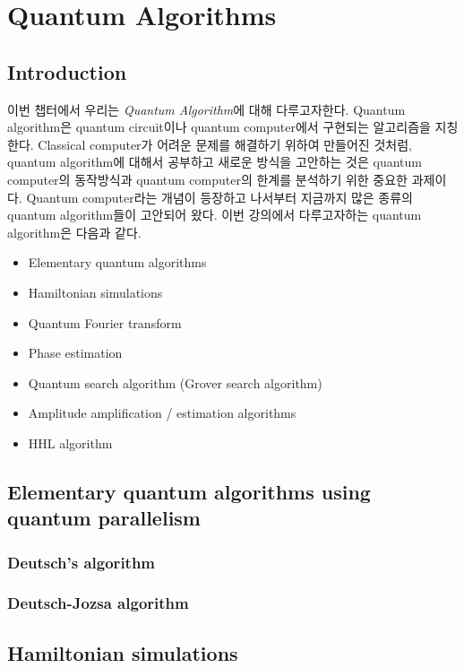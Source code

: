 \chapter{Quantum Algorithms}
\section{Introduction}
이번 챕터에서 우리는 \textit{Quantum Algorithm}에 대해 다루고자한다. Quantum algorithm은 quantum circuit이나 quantum computer에서 구현되는 알고리즘을 지칭한다.
Classical computer가 어려운 문제를 해결하기 위하여 만들어진 것처럼, quantum algorithm에 대해서 공부하고 새로운 방식을 고안하는 것은 quantum computer의 동작방식과 quantum computer의 한계를 분석하기 위한 중요한 과제이다. 
Quantum computer라는 개념이 등장하고 나서부터 지금까지 많은 종류의 quantum algorithm들이 고안되어 왔다. 이번 강의에서 다루고자하는 quantum algorithm은 다음과 같다. 
\begin{itemize}
  \item Elementary quantum algorithms
  \item Hamiltonian simulations
  \item Quantum Fourier transform
  \item Phase estimation
  \item Quantum search algorithm (Grover search algorithm)
  \item Amplitude amplification / estimation algorithms
  \item HHL algorithm
\end{itemize}

\section{Elementary quantum algorithms using quantum parallelism}
\subsection{Deutsch’s algorithm}

\subsection{Deutsch-Jozsa algorithm}

\section{Hamiltonian simulations}

